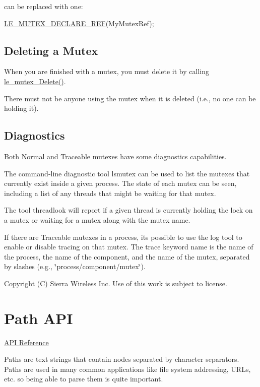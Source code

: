 can be replaced with one\+:


\begin{DoxyCode}
\hyperlink{le__mutex_8h_a7bada3ca8908be93ba5b393e460f6e80}{LE\_MUTEX\_DECLARE\_REF}(MyMutexRef);
\end{DoxyCode}
\hypertarget{c_mutex_c_mutex_delete}{}\subsection{Deleting a Mutex}\label{c_mutex_c_mutex_delete}
When you are finished with a mutex, you must delete it by calling \hyperlink{le__mutex_8h_a38571fa1d9c15d5f30ea9c480d8810c6}{le\+\_\+mutex\+\_\+\+Delete()}.

There must not be anyone using the mutex when it is deleted (i.\+e., no one can be holding it).\hypertarget{c_mutex_c_mutex_diagnostics}{}\subsection{Diagnostics}\label{c_mutex_c_mutex_diagnostics}
Both Normal and Traceable mutexes have some diagnostics capabilities.

The command-\/line diagnostic tool lsmutex can be used to list the mutexes that currently exist inside a given process. The state of each mutex can be seen, including a list of any threads that might be waiting for that mutex.

The tool threadlook will report if a given thread is currently holding the lock on a mutex or waiting for a mutex along with the mutex name.

If there are Traceable mutexes in a process, it\textquotesingle{}s possible to use the log tool to enable or disable tracing on that mutex. The trace keyword name is the name of the process, the name of the component, and the name of the mutex, separated by slashes (e.\+g., \char`\"{}process/component/mutex\char`\"{}).





Copyright (C) Sierra Wireless Inc. Use of this work is subject to license. \hypertarget{c_path}{}\section{Path A\+P\+I}\label{c_path}
\hyperlink{le__path_8h}{A\+P\+I Reference}





Paths are text strings that contain nodes separated by character separators. Paths are used in many common applications like file system addressing, U\+R\+Ls, etc. so being able to parse them is quite important.

